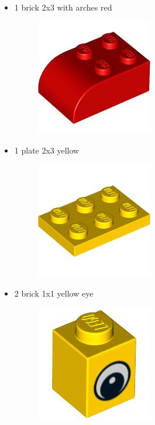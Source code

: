 \documentclass[a4paper,10pt]{article}
\begin{document}
\begin{itemize}
		 \item 1 brick 2x3 with arches red
		 	\begin{figure}[H]
 		  	\centering
 		  	\includegraphics[scale=.2]{brick_2x3_with_arches_red.jpg}
		 	\end{figure}
    
		 \item 1 plate 2x3 yellow
		 	\begin{figure}[ht]
 		  	\centering
 		  	\includegraphics[scale=.2]{plate_2x3_yellow.jpg}
		 	\end{figure}
		 	
		 \item 2 brick 1x1 yellow eye
		 	\begin{figure}[ht]
 		  	\centering
 		  	\includegraphics[scale=.2]{brick_1x1_yellow_eye.jpg}
		 	\end{figure}
	\end{itemize}
		 \newpage
          \vfill
\end{document}
